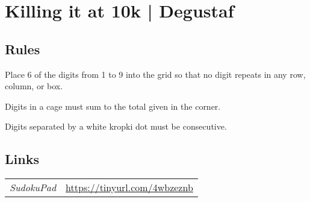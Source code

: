\section[Killing it at 10k | Degustaf {[\emph{Killer Mean Mini Sudoku}]}]{Killing it at 10k | {\normalfont Degustaf}}
\label{sec:34-killing-it-at-10k-degustaf}

\subsection*{Rules}
\begin{markdown}
Place 6 of the digits from 1 to 9 into the grid so that no digit repeats in any row, column, or box.

Digits in a cage must sum to the total given in the corner.

Digits separated by a white kropki dot must be consecutive.
\end{markdown}
\subsection*{Links}
\begin{tabularx}{\textwidth}{l X}
\emph{SudokuPad} & \url{https://tinyurl.com/4wbzeznb} \\
\end{tabularx}
\pagebreak
